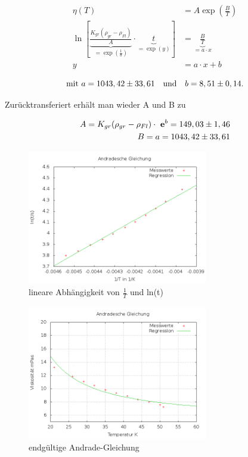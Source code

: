 \begin{align*}
 \eta(T) &= A \exp \left(\frac{B}{T}\right) \\
 \ln \left[ \underbrace{\frac{K_{gr}(\rho_{gr}-\rho_{Fl})}{A}}_{=\exp \left(\frac1b\right)} \cdot \underbrace{t}_{=\exp(y)}  \right] &= \underbrace{\frac{B}{T}}_{=a\cdot x}\\
 y &= a\cdot x + b
\end{align*}

\begin{equation}
\text{mit } a = 1043,42\pm 33,61 \quad \text{und} \quad b = 8,51 \pm 0,14.\\
\end{equation}

Zurücktransferiert erhält man wieder A und B zu

\begin{align}
 A = K_{gr}(\rho_{gr}-\rho_{Fl}) \cdot \ \mathbf{e}^b = 149,03 \pm 1,46\\
 B = a = 1043,42 \pm 33,61
\end{align}

\begin{figure}[H]
\includegraphics[width=0.7\textwidth] {pics/Andrade.png}
\centering
\caption{lineare Abhängigkeit von $\frac1T$ und ln(t)}
\end{figure}

\begin{figure}[H]
\includegraphics[width=0.7\textwidth] {pics/Viskos.png}
\centering
\caption{endgültige Andrade-Gleichung}
\end{figure}



